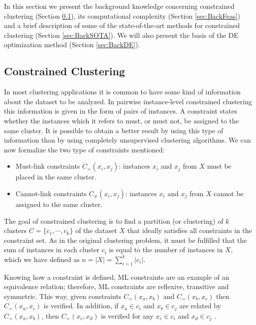 \documentclass[review]{elsarticle}
\begin{document}
In this section we present the background knowledge concerning constrained clustering (Section \ref{sec:BackCC}), its computational complexity (Section \ref{sec:BackFeas}) and a brief description of some of the state-of-the-art methods for constrained clustering (Section \ref{sec:BackSOTA}). We will also present the basis of the DE optimization method (Section \ref{sec:BackDE}).

\subsection{Constrained Clustering} \label{sec:BackCC}

In most clustering applications it is common to have some kind of information about the dataset to be analyzed. In pairwise instance-level constrained clustering this information is given in the form of pairs of instances. A constraint states whether the instances which it refers to must, or must not, be assigned to the same cluster. It is possible to obtain a better result by using this type of information than by using completely unsupervised clustering algorithms. We can now formalize the two type of constraints mentioned: 

\begin{itemize}

	\item Must-link constraints $C_=(x_i,x_j)$: instances $x_i$ and $x_j$ from $X$ must be placed in the same cluster.

	\item Cannot-link constraints $C_{\neq}(x_i,x_j)$: instances $x_i$ and $x_j$ from $X$ cannot be assigned to the same cluster.

\end{itemize}

The goal of constrained clustering is to find a partition (or clustering) of $k$ clusters $C = \{c_1, \cdots, c_k\}$ of the dataset $X$ that ideally satisfies all constraints in the constraint set. As in the original clustering problem, it must be fulfilled that the sum of instances in each cluster $c_i$ is equal to the number of instances in $X$, which we have defined as $n = |X| = \sum_{i = 1}^{k} |c_i|$.

Knowing how a constraint is defined, ML constraints are an example of an equivalence relation; therefore, ML constraints are reflexive, transitive and symmetric. This way, given constraints $C_=(x_a,x_b)$ and $C_=(x_b,x_c)$ then $C_=(x_a,x_c)$ is verified. In addition, if $x_a \in c_i$ and $x_b \in c_j$ are related by $C_=(x_a,x_b)$, then $C_=(x_c,x_d)$ is verified for any $x_c \in c_i$ and $x_d \in c_j$ \cite{davidson2007survey}.
\end{document}
